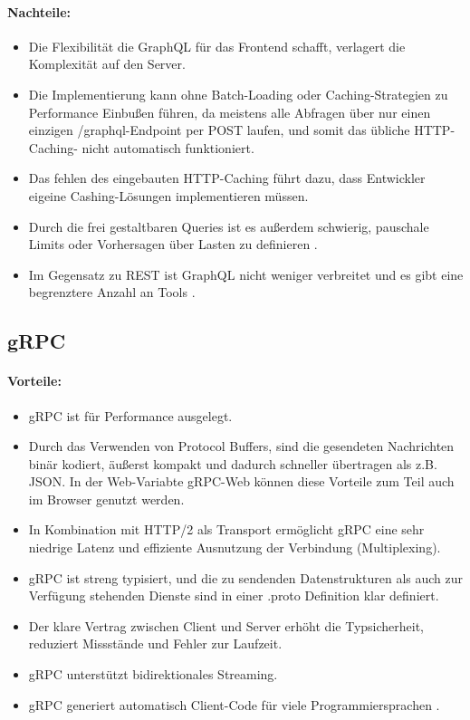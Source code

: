 \paragraph{Nachteile:}
\begin{itemize}
	\item Die Flexibilität die GraphQL für das Frontend schafft, verlagert die Komplexität auf den Server. 
	\item Die Implementierung kann ohne Batch-Loading oder Caching-Strategien zu Performance Einbußen führen, da meistens alle Abfragen über nur einen einzigen /graphql-Endpoint per POST laufen, und somit das übliche HTTP-Caching- nicht automatisch funktioniert. 
	\item Das fehlen des eingebauten HTTP-Caching führt dazu, dass Entwickler eigeine Cashing-Lösungen implementieren müssen. 
	\item Durch die frei gestaltbaren Queries ist es außerdem schwierig, pauschale Limits oder Vorhersagen über Lasten zu definieren \parencite{graphql-org,amazon2025graphql,redhat-apiguide}.
	\item Im Gegensatz zu REST ist GraphQL nicht weniger verbreitet und es gibt eine begrenztere Anzahl an Tools \parencite{postman2022, postman2023}.
\end{itemize}

\subsection{gRPC}

\paragraph{Vorteile:}
\begin{itemize}
	\item gRPC ist für Performance ausgelegt.  
	\item Durch das Verwenden von Protocol Buffers, sind die gesendeten Nachrichten binär kodiert, äußerst kompakt und dadurch schneller übertragen als z.B. JSON. In der Web-Variabte gRPC-Web können diese Vorteile zum Teil auch im Browser genutzt werden. 
	\item In Kombination mit HTTP/2 als Transport ermöglicht gRPC eine sehr niedrige Latenz und effiziente Ausnutzung der Verbindung (Multiplexing). 
	\item gRPC ist streng typisiert, und die zu sendenden Datenstrukturen als auch zur Verfügung stehenden Dienste sind in einer .proto Definition klar definiert. 
	\item Der klare Vertrag zwischen Client und Server erhöht die Typsicherheit, reduziert Missstände und Fehler zur Laufzeit.
	\item gRPC unterstützt bidirektionales Streaming. 
	\item gRPC generiert automatisch Client-Code für viele Programmiersprachen \parencite{gRPCAbout}.
\end{itemize}

